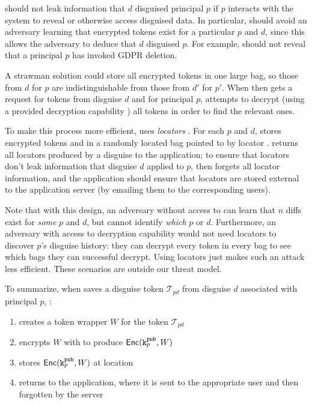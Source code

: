 \sys should not leak information that $d$ disguised principal $p$ if $p$ interacts with the system
to reveal or otherwise access disguised data. In particular, \sys should avoid an adversary learning
that encrypted tokens exist for a particular $p$ and $d$, since this allows the adversary to deduce
that $d$ disguised $p$. For example, \sys should not reveal that a principal $p$ has invoked GDPR
deletion.

A strawman solution could store all encrypted tokens in one large bag, so those from
$d$ for $p$ are indistinguishable from those from $d'$ for $p'$. When \sys then gets a request for
tokens from disguise $d$ and for principal $p$, \sys attempts to decrypt (using a provided
decryption capability ) all tokens in order to find the relevant ones.

To make this process more efficient, \sys uses \emph{locators }. For each $p$ and $d$,
\sys stores encrypted tokens  and  in a randomly located bag pointed to by
locator . \sys returns all locators produced by a disguise to the application; to ensure
that locators don't leak information that disguise $d$ applied to $p$, \sys then forgets all locator
information, and the application should ensure that locators are stored external to the application
server (\eg by emailing them to the corresponding users).

Note that with this design, an adversary without access to  can learn that $n$ diffs exist
for \emph{some} $p$ and $d$, but cannot identify \emph{which} $p$ or $d$.
%
Furthermore, an adversary with access to decryption capability  would not need locators to
discover $p$'s disguise history: they can decrypt every token in every bag to see which bags they
can successful decrypt. Using locators just makes such an attack less efficient.
%
These scenarios are outside our threat model.


To summarize, when \sys saves a disguise token $\mathcal{T}_{pd}$ from disguise $d$ associated with principal $p$, \sys:
\begin{enumerate}
    \item creates a token wrapper $W$ for the token $\mathcal{T}_{pd}$
    \item encrypts $W$ with  to produce $\mathsf{Enc}(\texttt{\ensuremath{\texttt{k}^{\text{pub}}_{p}}}, W)$
    \item stores $\mathsf{Enc}(\texttt{\ensuremath{\texttt{k}^{\text{pub}}_{p}}}, W)$ at location 
    \item returns  to the application, where it is sent to the appropriate user and then
        forgotten by the server
\end{enumerate}

